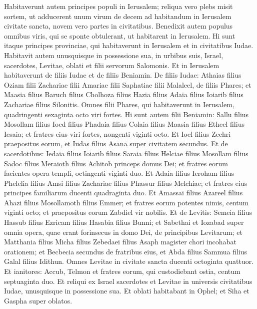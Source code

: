 \begin{biblechapter}  
\verse Habitaverunt autem principes populi in Ierusalem; reliqua vero plebs misit sortem, ut adducerent unum virum de decem ad habitandum in Ierusalem civitate sancta, novem vero partes in civitatibus. 
\verse Benedixit autem populus omnibus viris, qui se sponte obtulerant, ut habitarent in Ierusalem. 
\verse Hi sunt itaque principes provinciae, qui habitaverunt in Ierusalem et in civitatibus Iudae. Habitavit autem unusquisque in possessione sua, in urbibus suis, Israel, sacerdotes, Levitae, oblati et filii servorum Salomonis. 
\verse Et in Ierusalem habitaverunt de filiis Iudae et de filiis Beniamin. De filiis Iudae: Athaias filius Oziam filii Zachariae filii Amariae filii Saphatiae filii Malaleel, de filiis Phares; 
\verse et Maasia filius Baruch filius Cholhoza filius Hazia filius Adaia filius Ioiarib filius Zachariae filius Silonitis. 
\verse Omnes filii Phares, qui habitaverunt in Ierusalem, quadringenti sexaginta octo viri fortes. 
\verse Hi sunt autem filii Beniamin: Sallu filius Mosollam filius Ioed filius Phadaia filius Colaia filius Maasia filius Etheel filius Iesaia; 
\verse et fratres eius viri fortes, nongenti viginti octo. 
\verse Et Ioel filius Zechri praepositus eorum, et Iudas filius Asana super civitatem secundus. 
\verse Et de sacerdotibus: Iedaia filius Ioiarib filius 
\verse Saraia filius Helciae filius Mosollam filius Sadoc filius Meraioth filius Achitob princeps domus Dei; 
\verse et fratres eorum facientes opera templi, octingenti viginti duo. Et Adaia filius Ieroham filius Phelelia filius Amsi filius Zachariae filius Phassur filius Melchiae; 
\verse et fratres eius principes familiarum ducenti quadraginta duo. Et Amassai filius Azareel filius Ahazi filius Mosollamoth filius Emmer;  
\verse et fratres eorum potentes nimis, centum viginti octo; et praepositus eorum Zabdiel vir nobilis. 
\verse Et de Levitis: Semeia filius Hassub filius Ezricam filius Hasabia filius Bunni; 
\verse et Sabethai et Iozabad super omnia opera, quae erant forinsecus in domo Dei, de principibus Levitarum; 
\verse et Matthania filius Micha filius Zebedaei filius Asaph magister chori incohabat orationem; et Becbecia secundus de fratribus eius, et Abda filius Sammua filius Galal filius Idithun. 
\verse Omnes Levitae in civitate sancta ducenti octoginta quattuor. 
\verse Et ianitores: Accub, Telmon et fratres eorum, qui custodiebant ostia, centum septuaginta duo. 
\verse Et reliqui ex Israel sacerdotes et Levitae in universis civitatibus Iudae, unusquisque in possessione sua. 
\verse Et oblati habitabant in Ophel; et Siha et Gaspha super oblatos. 

\end{biblechapter}
